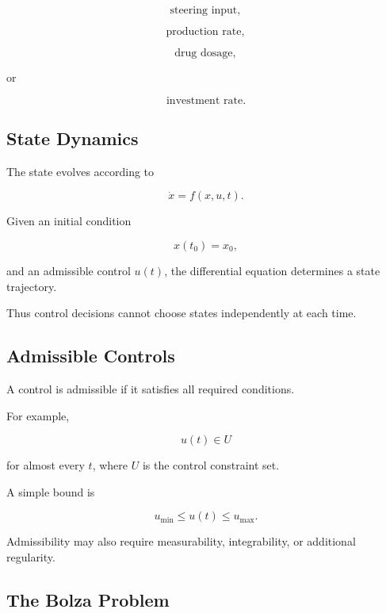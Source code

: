 \[
\boxed{
\text{steering input},
}
\]

\[
\boxed{
\text{production rate},
}
\]

\[
\boxed{
\text{drug dosage},
}
\]

or

\[
\boxed{
\text{investment rate}.
}
\]

\subsection{State Dynamics}
\label{subsec:optimal-control-dynamics}

The state evolves according to

\[
\boxed{
\dot{x}
=
f(x,u,t).
}
\]

Given an initial condition

\[
\boxed{
x(t_0)
=
x_0,
}
\]

and an admissible control \(u(t)\), the differential equation determines a
state trajectory.

Thus control decisions cannot choose states independently at each time.

\subsection{Admissible Controls}
\label{subsec:admissible-controls}

A control is admissible if it satisfies all required conditions.

For example,

\[
\boxed{
u(t)\in U
}
\]

for almost every \(t\), where \(U\) is the control constraint set.

A simple bound is

\[
\boxed{
u_{\min}
\leq
u(t)
\leq
u_{\max}.
}
\]

Admissibility may also require measurability, integrability, or additional
regularity.

\subsection{The Bolza Problem}
\label{subsec:bolza-problem}

